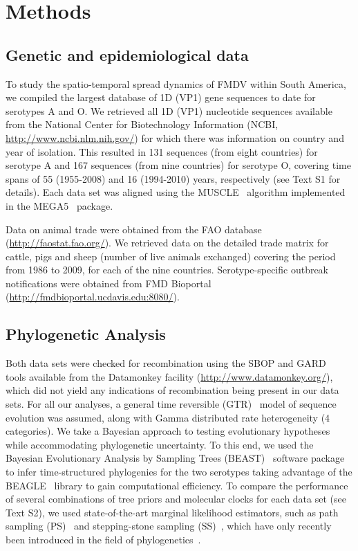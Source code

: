 \documentclass[10pt]{article}
\begin{document}
\section*{Methods}

\subsection*{Genetic and epidemiological data}

To study the spatio-temporal spread dynamics of FMDV within South America, we compiled the largest database of 1D (VP1) gene sequences to date for serotypes A and O.
We retrieved all 1D (VP1) nucleotide sequences available from the National Center for Biotechnology Information (NCBI, \url{ http://www.ncbi.nlm.nih.gov/}) for which there was information on country and year of isolation.
This resulted in 131 sequences (from eight countries) for serotype A and 167 sequences (from nine countries) for serotype O, covering time spans of 55 (1955-2008) and 16 (1994-2010) years, respectively (see Text S1 for details).
Each data set was aligned using the MUSCLE~\cite{muscle} algorithm implemented in the MEGA5~\cite{MEGA} package.

Data on animal trade were obtained from the FAO database (\url{http://faostat.fao.org/}).
We retrieved data on the detailed trade matrix for cattle, pigs and sheep (number of live animals exchanged) covering the period from 1986 to 2009, for each of the nine countries.
Serotype-specific outbreak notifications were obtained from FMD Bioportal (\url{http://fmdbioportal.ucdavis.edu:8080/}).

\subsection*{Phylogenetic Analysis}

Both data sets were checked for recombination using the SBOP and GARD~\cite{sbpgard} tools available from the Datamonkey facility (\url{http://www.datamonkey.org/}), which did not yield any indications of recombination being present in our data sets.
For all our analyses, a general time reversible (GTR)~\cite{Tavare1986} model of sequence evolution was assumed, along with Gamma distributed rate heterogeneity (4 categories).
We take a Bayesian approach to testing evolutionary hypotheses while accommodating phylogenetic uncertainty. 
To this end, we used the Bayesian Evolutionary Analysis by Sampling Trees (BEAST)~\cite{beast2012} software package to infer time-structured phylogenies for the two serotypes taking advantage of the  BEAGLE~\cite{BEAGLE} library to gain computational efficiency.
To compare the performance of several combinations of tree priors and molecular clocks for each data set (see Text S2), we used state-of-the-art marginal likelihood estimators, such as path sampling (PS)~\cite{LartillotPhilippe} and stepping-stone sampling (SS)~\cite{Xie}, which have only recently been introduced in the field of phylogenetics~\cite{LartillotPhilippe, Xie, Baele2012, Baele2013a, Baele2013b, Baele2013c}.
\end{document}
